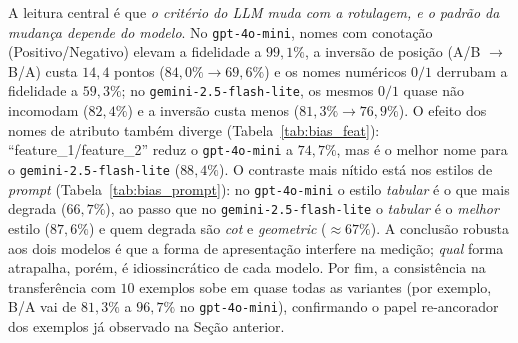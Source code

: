 \documentclass[12pt,a4paper]{article}
\begin{document}
A leitura central é que \emph{o critério do LLM muda com a rotulagem, e o padrão da
mudança depende do modelo}. No \texttt{gpt-4o-mini}, nomes com conotação
(Positivo/Negativo) elevam a fidelidade a $99{,}1\%$, a inversão de posição (A/B $\to$
B/A) custa $14{,}4$ pontos ($84{,}0\% \to 69{,}6\%$) e os nomes numéricos $0/1$ derrubam a
fidelidade a $59{,}3\%$; no \texttt{gemini-2.5-flash-lite}, os mesmos $0/1$ quase não
incomodam ($82{,}4\%$) e a inversão custa menos ($81{,}3\% \to 76{,}9\%$). O efeito dos
nomes de atributo também diverge (Tabela~\ref{tab:bias_feat}):
``feature\_1/feature\_2'' reduz o \texttt{gpt-4o-mini} a
$74{,}7\%$, mas é o melhor nome para o \texttt{gemini-2.5-flash-lite} ($88{,}4\%$). O
contraste mais nítido está nos estilos de \emph{prompt}
(Tabela~\ref{tab:bias_prompt}): no \texttt{gpt-4o-mini} o estilo
\emph{tabular} é o que mais degrada ($66{,}7\%$), ao passo que no
\texttt{gemini-2.5-flash-lite} o \emph{tabular} é o \emph{melhor} estilo ($87{,}6\%$) e
quem degrada são \emph{cot} e \emph{geometric} ($\approx 67\%$). A conclusão robusta aos
dois modelos é que a forma de apresentação interfere na medição; \emph{qual} forma
atrapalha, porém, é idiossincrático de cada modelo. Por fim, a consistência na
transferência com $10$ exemplos sobe em quase todas as variantes (por exemplo, B/A vai de
$81{,}3\%$ a $96{,}7\%$ no \texttt{gpt-4o-mini}), confirmando o papel re-ancorador dos
exemplos já observado na Seção anterior.
\end{document}
